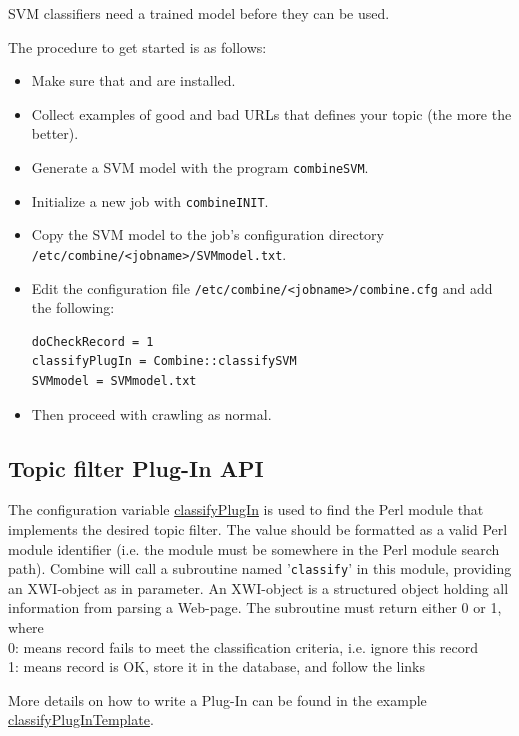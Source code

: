 SVM classifiers need a trained model before they can be used.

The procedure to get started is as follows:
\begin{itemize}
\item Make sure that  and  are installed.
\item Collect examples of good and bad URLs that defines your topic (the more the better).
\item Generate a SVM model with the program {\tt combineSVM}.
\item Initialize a new job with {\tt combineINIT}.
\item Copy the SVM model to the job's configuration directory {\tt /etc/combine/<jobname>/SVMmodel.txt}.
\item Edit the configuration file {\tt /etc/combine/<jobname>/combine.cfg} and add the following:
\begin{verbatim}
doCheckRecord = 1
classifyPlugIn = Combine::classifySVM
SVMmodel = SVMmodel.txt
\end{verbatim}
\item Then proceed with crawling as normal.
\end{itemize}

\subsection{Topic filter Plug-In API}
The configuration variable \hyperref{classifyPlugIn}{classifyPlugIn (section }{)}{classifyPlugIn} is used to find
the Perl module that implements the desired topic filter.
The value should be formatted as a valid Perl module identifier (i.e.
the module must be somewhere in the Perl module search path).
Combine will call a subroutine named '\verb+classify+' in this module,
providing an XWI-object as in parameter. An XWI-object is a structured object holding all information from
parsing a Web-page.
The subroutine must
return either 0 or 1, where\\
\hspace*{\parindent}0: means record fails to meet the classification criteria, i.e. ignore this record\\
\hspace*{\parindent}1: means record is OK, store it in the database, and follow the links

More details on how to write a Plug-In can be found in the example
\hyperref{classifyPlugInTemplate.pm}{classifyPlugInTemplate.pm (see Appendix }{)}{classifyPlugInTemplate}.

